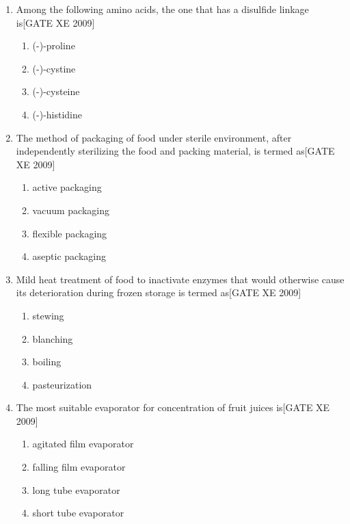 \documentclass[journal,12pt,onecolumn]{IEEEtran}
\theoremstyle{remark}
\begin{document}
\begin{enumerate}
\item Among the following amino acids, the one that has a disulfide linkage is\hfill[GATE XE 2009]
\begin{multicols}{2}
\begin{enumerate}
\item (-)-proline
\item (-)-cystine
\item (-)-cysteine
\item (-)-histidine
\end{enumerate}
\end{multicols}

\item The method of packaging of food under sterile environment, after independently sterilizing the food and packing material, is termed as\hfill[GATE XE 2009]
\begin{multicols}{2}
\begin{enumerate}
\item active packaging
\item vacuum packaging
\item flexible packaging
\item aseptic packaging
\end{enumerate}
\end{multicols}

\item Mild heat treatment of food to inactivate enzymes that would otherwise cause its deterioration during frozen storage is termed as\hfill[GATE XE 2009]
\begin{multicols}{2}
\begin{enumerate}
\item stewing
\item blanching
\item boiling
\item pasteurization
\end{enumerate}
\end{multicols}

\item The most suitable evaporator for concentration of fruit juices is\hfill[GATE XE 2009]
\begin{multicols}{2}
\begin{enumerate}
\item agitated film evaporator
\item falling film evaporator
\item long tube evaporator
\item short tube evaporator
\end{enumerate}
\end{multicols}


\end{enumerate}
\end{document}
